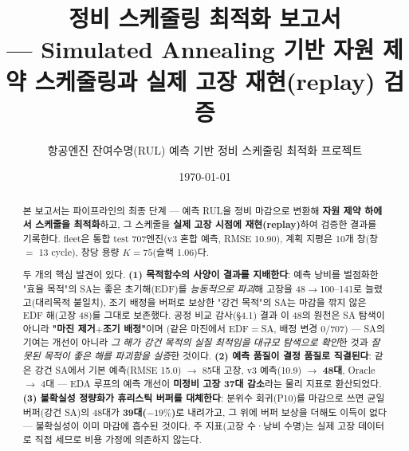 \documentclass[11pt]{article}
\title{\textbf{정비 스케줄링 최적화 보고서}\\[3pt]
\large — Simulated Annealing 기반 자원 제약 스케줄링과 실제 고장 재현(replay) 검증}
\author{항공엔진 잔여수명(RUL) 예측 기반 정비 스케줄링 최적화 프로젝트}
\date{\today}
\begin{document}
\maketitle

\begin{abstract}
\noindent
본 보고서는 파이프라인의 최종 단계 — 예측 RUL을 정비 마감으로 변환해 \textbf{자원 제약 하에서 스케줄을 최적화}하고,
그 스케줄을 \textbf{실제 고장 시점에 재현(replay)}하여 검증한 결과를 기록한다.
fleet은 통합 test 707엔진(v3 혼합 예측, RMSE 10.90), 계획 지평은 10개 창(창 $=$ 13 cycle), 창당 용량 $K{=}75$(슬랙 1.06)다.

두 개의 핵심 발견이 있다.
\textbf{(1) 목적함수의 사양이 결과를 지배한다}: 예측 낭비를 벌점화한 "효율 목적"의 SA는
좋은 초기해(EDF)를 \emph{능동적으로 파괴}해 고장을 48$\to$100--141로 늘렸고(대리목적 불일치),
조기 배정을 버퍼로 보상한 "강건 목적"의 SA는 마감을 깎지 않은 EDF 해(고장 48)를 그대로 보존했다.
공정 비교 감사(\S4.1) 결과 이 48의 원천은 SA 탐색이 아니라 \textbf{"마진 제거$+$조기 배정"}이며
(같은 마진에서 EDF$=$SA, 배정 변경 0/707) — SA의 기여는 개선이 아니라
\emph{그 해가 강건 목적의 실질 최적임을 대규모 탐색으로 확인}한 것과
\emph{잘못된 목적이 좋은 해를 파괴함을 실증}한 것이다.
\textbf{(2) 예측 품질이 결정 품질로 직결된다}: 같은 강건 SA에서 기본 예측(RMSE 15.0) $\to$ 85대 고장,
v3 예측(10.9) $\to$ \textbf{48대}, Oracle $\to$ 4대 —
EDA 루프의 예측 개선이 \textbf{미정비 고장 37대 감소}라는 물리 지표로 환산되었다.
\textbf{(3) 불확실성 정량화가 휴리스틱 버퍼를 대체한다}: 분위수 회귀(P10)를 마감으로 쓰면
균일 버퍼(강건 SA)의 48대가 \textbf{39대($-19\%$)}로 내려가고, 그 위에 버퍼 보상을 더해도 이득이 없다 —
불확실성이 이미 마감에 흡수된 것이다.
주 지표(고장 수·낭비 수명)는 실제 고장 데이터로 직접 세므로 비용 가정에 의존하지 않는다.
\end{abstract}
\vspace{0.5em}
\begin{center}\end{center}
\vspace{0.5em}
\end{document}
